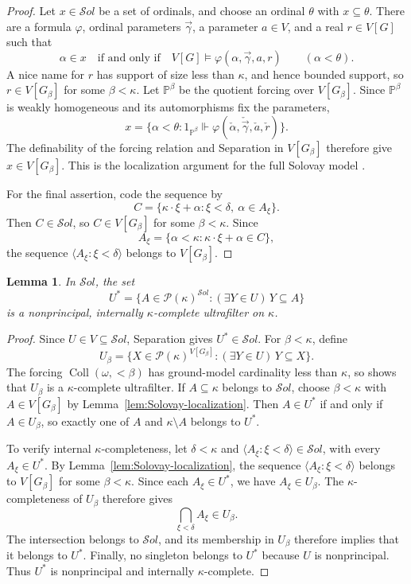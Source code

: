 \documentclass[11pt,a4paper]{amsart}
\newcommand{\Coll}{\operatorname{Coll}}
\theoremstyle{plain}
\newtheorem{lemma}[theorem]{Lemma}
\theoremstyle{definition}
\theoremstyle{remark}
\begin{document}
\begin{proof}
Let $x\in\mathcal S\!ol$ be a set of ordinals, and choose an ordinal $\theta$ with $x\subseteq\theta$.  There are a formula $\varphi$, ordinal parameters $\vec\gamma$, a parameter $a\in V$, and a real $r\in V[G]$ such that
\[
\alpha\in x\quad\text{if and only if}\quad
V[G]\models\varphi(\alpha,\vec\gamma,a,r)
\qquad(\alpha<\theta).
\]
A nice name for $r$ has support of size less than $\kappa$, and hence bounded support, so $r\in V[G_\beta]$ for some $\beta<\kappa$.  Let $\mathbb P^\beta$ be the quotient forcing over $V[G_\beta]$.  Since $\mathbb P^\beta$ is weakly homogeneous and its automorphisms fix the parameters,
\[
x=\{\alpha<\theta:
1_{\mathbb P^\beta}\Vdash
\varphi(\check\alpha,\check{\vec\gamma},\check a,\check r)\}.
\]
The definability of the forcing relation and Separation in $V[G_\beta]$ therefore give $x\in V[G_\beta]$.  This is the localization argument for the full Solovay model \cite[Definition~4, Fact~5, and the paragraph following Fact~5]{SakaiTanno}.

For the final assertion, code the sequence by
\[
C=\{\kappa\cdot\xi+\alpha:\xi<\delta,\ \alpha\in A_\xi\}.
\]
Then $C\in\mathcal S\!ol$, so $C\in V[G_\beta]$ for some $\beta<\kappa$.  Since
\[
A_\xi=\{\alpha<\kappa:\kappa\cdot\xi+\alpha\in C\},
\]
the sequence $\langle A_\xi:\xi<\delta\rangle$ belongs to $V[G_\beta]$.
\end{proof}

\begin{lemma}\label{lem:Solovay-measure}
In $\mathcal S\!ol$, the set
\[
U^*=\{A\in\mathcal P(\kappa)^{\mathcal S\!ol}:
(\exists Y\in U)\,Y\subseteq A\}
\]
is a nonprincipal, internally $\kappa$-complete ultrafilter on $\kappa$.
\end{lemma}

\begin{proof}
Since $U\in V\subseteq\mathcal S\!ol$, Separation gives $U^*\in\mathcal S\!ol$.  For $\beta<\kappa$, define
\[
U_\beta=\{X\in\mathcal P(\kappa)^{V[G_\beta]}:
(\exists Y\in U)\,Y\subseteq X\}.
\]
The forcing ${\Coll}(\omega,{<}\beta)$ has ground-model cardinality less than $\kappa$, so \cite[Theorem~2.5(2)]{Banerjee} shows that $U_\beta$ is a $\kappa$-complete ultrafilter.  If $A\subseteq\kappa$ belongs to $\mathcal S\!ol$, choose $\beta<\kappa$ with $A\in V[G_\beta]$ by Lemma~\ref{lem:Solovay-localization}.  Then $A\in U^*$ if and only if $A\in U_\beta$, so exactly one of $A$ and $\kappa\setminus A$ belongs to $U^*$.

To verify internal $\kappa$-completeness, let $\delta<\kappa$ and
$\langle A_\xi:\xi<\delta\rangle\in\mathcal S\!ol$, with every
$A_\xi\in U^*$.  By Lemma~\ref{lem:Solovay-localization}, the sequence
$\langle A_\xi:\xi<\delta\rangle$ belongs to $V[G_\beta]$ for some
$\beta<\kappa$.  Since each $A_\xi\in U^*$, we have $A_\xi\in U_\beta$.  The $\kappa$-completeness of $U_\beta$ therefore gives
\[
\bigcap_{\xi<\delta}A_\xi\in U_\beta.
\]
The intersection belongs to $\mathcal S\!ol$, and its membership in $U_\beta$ therefore implies that it belongs to $U^*$.  Finally, no singleton belongs to $U^*$ because $U$ is nonprincipal.  Thus $U^*$ is nonprincipal and internally $\kappa$-complete.
\end{proof}
\end{document}
